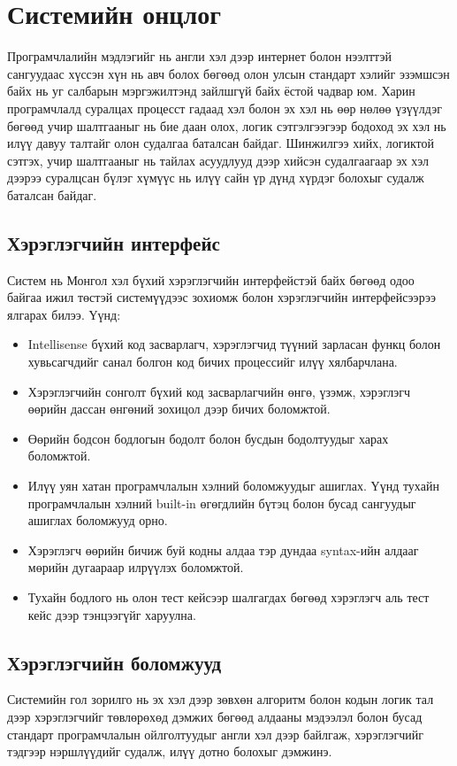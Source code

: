 \clearpage

\section{Системийн онцлог}
Програмчлалийн мэдлэгийг нь англи хэл дээр интернет болон нээлттэй сангуудаас хүссэн хүн нь авч болох бөгөөд олон улсын стандарт хэлийг эзэмшсэн байх нь уг салбарын мэргэжилтэнд зайлшгүй байх ёстой чадвар юм. Харин програмчлалд суралцах процесст гадаад хэл болон эх хэл нь өөр нөлөө үзүүлдэг бөгөөд учир шалтгааныг нь бие даан олох, логик сэтгэлгээгээр бодоход эх хэл нь илүү давуу талтайг олон судалгаа баталсан байдаг. Шинжилгээ хийх, логиктой сэтгэх, учир шалтгааныг нь тайлах асуудлууд дээр хийсэн судалгаагаар эх хэл дээрээ суралцсан бүлэг хүмүүс нь илүү сайн үр дүнд хүрдэг болохыг судалж баталсан байдаг\cite{motherLanguage}.

\subsection{Хэрэглэгчийн интерфейс}
Систем нь Монгол хэл бүхий хэрэглэгчийн интерфейстэй байх бөгөөд одоо байгаа ижил төстэй системүүдээс зохиомж болон хэрэглэгчийн интерфейсээрээ ялгарах билээ. Үүнд: 
\begin{itemize}
  \item Intellisense\footnotemark{}  бүхий код засварлагч, хэрэглэгчид түүний зарласан функц болон хувьсагчдийг санал болгон код бичих процессийг илүү хялбарчлана.
  \item Хэрэглэгчийн сонголт бүхий код засварлагчийн өнгө, үзэмж, хэрэглэгч өөрийн дассан өнгөний зохицол дээр бичих боломжтой.
  \item Өөрийн бодсон бодлогын бодолт болон бусдын бодолтуудыг харах боломжтой.
  \item Илүү уян хатан програмчлалын хэлний боломжуудыг ашиглах. Үүнд тухайн програмчлалын хэлний built-in өгөгдлийн бүтэц болон бусад сангуудыг ашиглах боломжууд орно. 
  \item Хэрэглэгч өөрийн бичиж буй кодны алдаа тэр дундаа syntax\footnotemark{}-ийн алдааг мөрийн дугаараар илрүүлэх боломжтой. 
  \item Тухайн бодлого нь олон тест кейсээр шалгагдах бөгөөд хэрэглэгч аль тест кейс дээр тэнцээгүйг харуулна.
\end{itemize}

\subsection{Хэрэглэгчийн боломжууд}
Системийн гол зорилго нь эх хэл дээр зөвхөн алгоритм болон кодын логик тал дээр хэрэглэгчийг төвлөрөхөд дэмжих бөгөөд алдааны мэдээлэл болон бусад стандарт програмчлалын ойлголтуудыг англи хэл дээр байлгаж, хэрэглэгчийг тэдгээр нэршлүүдийг судалж, илүү дотно болохыг дэмжинэ.

